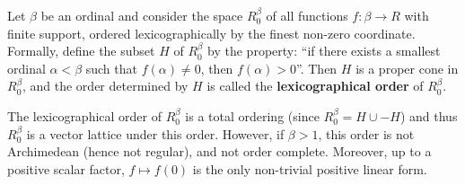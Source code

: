 Let $\beta$ be an ordinal and consider the space $R_0^\beta$ of all functions $f: \beta \to R$ with finite support, ordered lexicographically by the finest non-zero coordinate. Formally, define the subset $H$ of $R_0^\beta$ by the property: ``if there exists a smallest ordinal $\alpha < \beta$ such that $f(\alpha) \neq 0$, then $f(\alpha) > 0$''. Then $H$ is a proper cone in $R_0^\beta$, and the order determined by $H$ is called the \textbf{lexicographical order} of $R_0^\beta$.

The lexicographical order of $R_0^\beta$ is a total ordering (since $R_0^\beta = H \cup -H$) and thus $R_0^\beta$ is a vector lattice under this order. However, if $\beta > 1$, this order is not Archimedean (hence not regular), and not order complete. Moreover, up to a positive scalar factor, $f \mapsto f(0)$ is the only non-trivial positive linear form.
